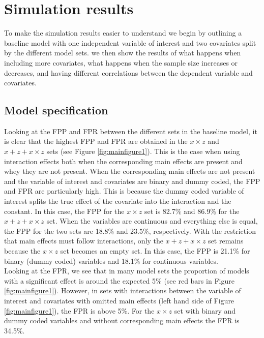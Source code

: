 \section{Simulation results} 
To make the simulation results easier to understand we begin by outlining a baseline model with one independent variable of interest and two covariates split by the different model sets. we then show the results of what happens when including more covariates, what happens when the sample size increases or decreases, and having different correlations between the dependent variable and covariates. 

\subsection{Model specification}
Looking at the FPP and FPR between the different sets in the baseline model, it is clear that the highest FPP and FPR are obtained in the $x \times z$ and $x + z+ x \times z$ sets (see Figure \ref{fig:mainfigure1}). This is the case when using interaction effects both when the corresponding main effects are present and whey they are not present. When the corresponding main effects are not present and the variable of interest and covariates are binary and dummy coded, the FPP and FPR are particularly high. This is because the dummy coded variable of interest splits the true effect of the covariate into the interaction and the constant. In this case, the FPP for the $x \times z$ set is 82.7\% and 86.9\% for the $x + z+ x \times z$ set. When the variables are continuous and everything else is equal, the FPP for the two sets are 18.8\% and 23.5\%, respectively. With the restriction that main effects must follow interactions, only the $x + z+ x \times z$ set remains because the $x \times z$ set becomes an empty set. In this case, the FPP is 21.1\% for binary (dummy coded) variables and 18.1\% for continuous variables. \\ 
Looking at the FPR, we see that in many model sets the proportion of models with a significant effect is around the expected 5\%  (see red bars in Figure \ref{fig:mainfigure1}). However, in sets with interactions between the variable of interest and covariates with omitted main effects (left hand side of Figure \ref{fig:mainfigure1}), the FPR is above 5\%. For the $x \times z$ set with binary and dummy coded variables and without corresponding main effects the FPR is 34.5\%.
 \\

